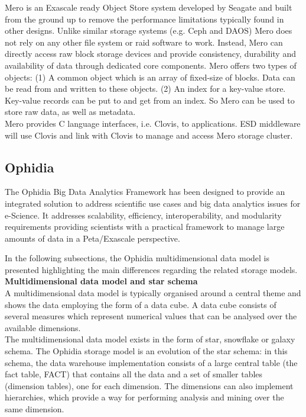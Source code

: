 Mero is an Exascale ready Object Store system developed by Seagate and built
from the ground up to remove the performance limitations typically found in
other designs. Unlike similar storage systems (e.g. Ceph and DAOS) Mero does
not rely on any other file system or raid software to work.
Instead, Mero can directly access raw block storage devices and provide consistency, durability
and availability of data through dedicated core components. Mero offers two
types of objects: (1) A common object which is an array of fixed-size of blocks. Data
can be read from and written to these objects. (2) An index for a key-value store.
Key-value records can be put to and get from an index. So Mero can be used to
store raw data, as well as metadata. \\
Mero provides C language interfaces, i.e. Clovis, to applications.
ESD middleware will use Clovis and link with Clovis to manage and access Mero storage cluster.

\subsection{Ophidia}
\label{Ophidia Storage Model}

The Ophidia Big Data Analytics Framework \cite{DBLP:conf/iccS/FioreDPFWA13} has been designed to provide an integrated solution to address scientific use cases and big data analytics issues for e-Science.
It addresses scalability, efficiency, interoperability, and modularity requirements providing scientists with a practical framework to manage large amounts of data in a Peta/Exascale perspective.

In the following subsections, the Ophidia multidimensional data model is presented highlighting the main differences regarding the related storage models.\\

\textbf{Multidimensional data model and star schema}\\

A multidimensional data model is typically organised around a central theme and shows the data employing the form of a data cube. A data cube consists of several measures which represent numerical values that can be analysed over the available dimensions.\\

The multidimensional data model exists in the form of star, snowflake or galaxy schema.
The Ophidia storage model is an evolution of the star schema: in this schema, the data warehouse implementation consists of a large central table (the fact table, FACT) that contains all the data and a set of smaller tables (dimension tables), one for each dimension. The dimensions can also implement hierarchies, which provide a way for performing analysis and mining over the same dimension.

